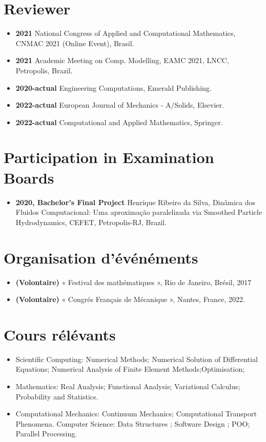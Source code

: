 \documentclass[french]{article}
\begin{document}
\section{Reviewer} 
\begin{itemize}
\item \textbf{2021} National Congress of Applied and Computational Mathematics, CNMAC 2021 (Online Event), Brasil. \\
\item \textbf{2021}  Academic Meeting on Comp. Modelling, EAMC 2021, LNCC, Petropolis, Brazil. \\
\item \textbf{2020-actual} Engineering Computations, Emerald Publishing.
\item \textbf{2022-actual} European Journal of Mechanics - A/Solids, Elsevier.
\item \textbf{2022-actual} Computational and Applied Mathematics, Springer.
\end{itemize}

\section{Participation in Examination Boards} 
\begin{itemize}
\item \textbf{2020, Bachelor's Final Project} Henrique Ribeiro da Silva, Dinâmica dos Fluidos Computacional: Uma aproximação paralelizada via Smoothed Particle Hydrodynamics, CEFET, Petropolis-RJ, Brazil.
\end{itemize}


\section{Organisation d'événéments}
\begin{itemize}
\item \textbf{(Volontaire)} « Festival des mathématiques », Rio de Janeiro, Brésil, 2017
\item \textbf{(Volontaire)} « Congrés Français de Mécanique », Nantes, France, 2022.
\end{itemize}


\section{Cours rélévants}
\begin{itemize}
	\item Scientific Computing: Numerical Methods; Numerical Solution of Differential Equations; Numerical Analysis of Finite Element Methods;Optimisation;
	\item Mathematics: Real Analysis; Functional Analysis; Variational Calculus; Probability and Statistics.
	\item Computational Mechanics: Continuum Mechanics; Computational Transport Phenomena.
	Computer Science: Data Structures ; Software Design ; POO; Parallel Processing. 
\end{itemize}
\end{document}
